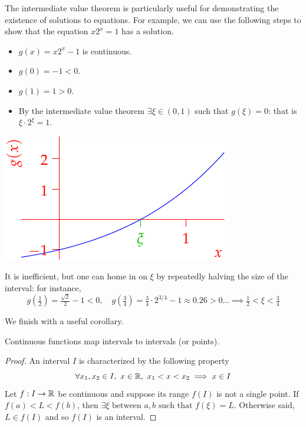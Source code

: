 \begin{example}{}{}
	The intermediate value theorem is particularly useful for demonstrating the existence of solutions to equations. For example, we can use the following steps to show that the equation $x2^x=1$ has a solution.\smallbreak
	\begin{minipage}[t]{0.6\linewidth}\vspace{-10pt}
	\begin{itemize}
		\item $g(x)=x2^x-1$ is continuous.
		\item $g(0)=-1<0$.
		\item $g(1)=1>0$.
		\item By the intermediate value theorem $\exists \xi\in(0,1)$ such that $g(\xi)=0$: that is $\xi\cdot 2^\xi=1$.
	\end{itemize}
	\end{minipage}\begin{minipage}[t]{0.4\linewidth}\vspace{-15pt}
	\flushright\includegraphics{intval3}
	\end{minipage}\bigbreak
	
	It is inefficient, but one can home in on $\xi$ by repeatedly halving the size of the interval: for instance,
	\[g(\tfrac 12)=\tfrac{\sqrt 2}2-1<0,\quad g(\tfrac 34)=\tfrac 34\cdot 2^{3/4}-1\approx 0.26>0\ldots\implies \tfrac 12<\xi<\tfrac 34\]
\end{example}

We finish with a useful corollary.

\begin{cor}{}{}
Continuous functions map intervals to intervals (or points).
\end{cor}

\begin{proof}
An interval $I$ is characterized by the following property
\[\forall x_1,x_2\in I,\ x\in\R,\ x_1<x<x_2\implies x\in I\]
Let $f:I\to\mathbb{R}$ be continuous and suppose its range $f(I)$ is not a single point. If $f(a)<L<f(b)$, then $\exists \xi\text{ between $a,b$ such that }f(\xi)=L$. Otherwise said, $L\in f(I)$ and so $f(I)$ is an interval.
\end{proof}

